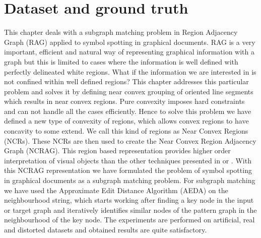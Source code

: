 \chapter{Dataset and ground truth} %
\label{chap:dt}
\graphicspath{{./chapters/9-gt/figs/}}
This chapter\cite{Guerin2013} deals with a subgraph matching problem in Region Adjacency Graph (RAG) applied to symbol spotting in graphical documents. RAG is a very important, efficient and natural way of representing graphical information with a graph but this is limited to cases where the information is well defined with perfectly delineated white regions. What if the information we are interested in is not confined within well defined regions? This chapter addresses this particular problem and solves it by defining near convex grouping of oriented line segments which results in near convex regions. Pure convexity imposes hard constraints and can not handle all the cases efficiently. Hence to solve this problem we have defined a new type of convexity of regions, which allows convex regions to have concavity to some extend. We call this kind of regions as Near Convex Regions (NCRs). These NCRs are then used to create the Near Convex Region Adjacency Graph (NCRAG). This region based representation provides higher order interpretation of visual objects than the other techniques presented in  or . With this NCRAG representation we have formulated the problem of symbol spotting in graphical documents as a subgraph matching problem. For subgraph matching we have used the Approximate Edit Distance Algorithm (AEDA) on the neighbourhood string, which starts working after finding a key node in the input or target graph and iteratively identifies similar nodes of the pattern graph in the neighbourhood of the key node. The experiments are performed on artificial, real and distorted datasets and obtained results are quite satisfactory.
